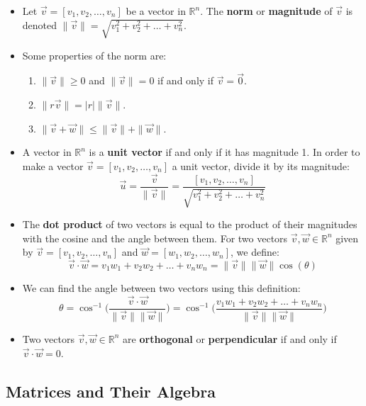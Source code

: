\documentclass[11pt]{amsart}
\newcommand{\reals}{\mathbb{R}}
\begin{document}
\begin{itemize}

	\item{
		Let $\vec{v} = [ v_1, v_2, \dots, v_n]$ be a vector in $\reals^n$. The \textbf{norm} or \textbf{magnitude} of $\vec{v}$ is denoted
		$\| \vec{v} \| = \sqrt{v_1^2 + v_2^2 + \dots + v_n^2}$.
	}
	\item{
		Some properties of the norm are:
		\begin{enumerate}
		
			\item{
				$\| \vec{v} \| \geq 0$ and $\| \vec{v} \| = 0$ if and only if $\vec{v} = \vec{0}$.
			}
			\item{
				$\| r \vec{v} \| = | r | \| \vec{v} \|$.
			}
			\item{
				$ \| \vec{v} + \vec{w} \| \leq \| \vec{v} \| + \| \vec{w} \|$.
			}
		\end{enumerate}
	}
	\item{
		A vector in $\reals^n$ is a \textbf{unit vector} if and only if it has magnitude 1. In order to make a vector 
		$\vec{v} = [ v_1, v_2, \dots, v_n]$ a unit vector, divide it by its magnitude:
		\[ 
			\vec{u} = \frac{\vec{v}}{\| \vec{v} \|} = \frac{[ v_1, v_2, \dots, v_n]}{\sqrt{v_1^2 + v_2^2 + \dots + v_n^2}}
		\]
	}
	\item{
		The \textbf{dot product} of two vectors is equal to the product of their magnitudes with the cosine and the angle between them.
		For two vectors $\vec{v}, \vec{w} \in \reals^n$ given by $\vec{v} = [ v_1, v_2, \dots, v_n]$ and $\vec{w} = [ w_1, w_2, \dots, w_n]$, we
		define:
		\[
			\vec{v} \cdot \vec{w} = v_1 w_1 + v_2 w_2 + \dots + v_n w_n = \| \vec{v} \| \| \vec{w} \| \cos(\theta)
		\]
	}
	\item{
		We can find the angle between two vectors using this definition:
		\[
			\theta = \cos^{-1} \bigg(\frac{\vec{v} \cdot \vec{w}}{\| \vec{v} \| \| \vec{w} \|} \bigg)
			= \cos^{-1} \bigg(\frac{v_1 w_1 + v_2 w_2 + \dots + v_n w_n}{\| \vec{v} \| \| \vec{w} \|} \bigg)
		\]
	}
	\item{
		Two vectors $\vec{v}, \vec{w} \in \reals^n$ are \textbf{orthogonal} or \textbf{perpendicular} if and only if $\vec{v} \cdot \vec{w} = 0$.
	}
\end{itemize}

\subsection{Matrices and Their Algebra}
\end{document}
